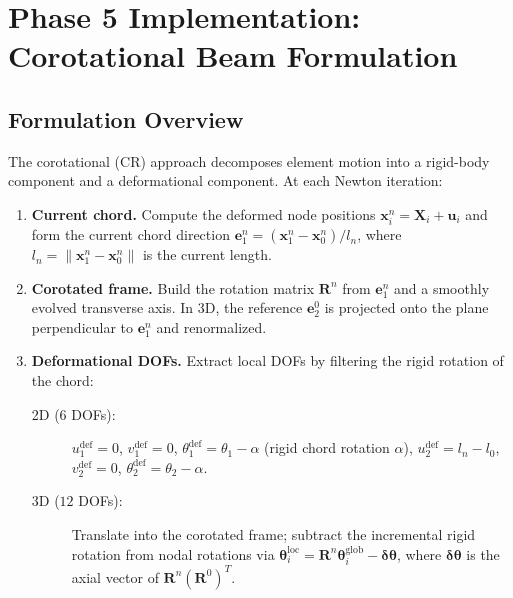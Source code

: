 \section{Phase 5 Implementation: Corotational Beam Formulation}
\label{sec:phase5-corotational}

\subsection{Formulation Overview}

The corotational (CR) approach decomposes element motion into a
rigid-body component and a deformational component.  At each Newton
iteration:

\begin{enumerate}
  \item \textbf{Current chord.}  Compute the deformed node positions
    $\mathbf{x}_i^n = \mathbf{X}_i + \mathbf{u}_i$ and form the
    current chord direction $\mathbf{e}_1^n = (\mathbf{x}_1^n -
    \mathbf{x}_0^n)/l_n$, where $l_n = \|\mathbf{x}_1^n -
    \mathbf{x}_0^n\|$ is the current length.

  \item \textbf{Corotated frame.}  Build the rotation matrix
    $\mathbf{R}^n$ from $\mathbf{e}_1^n$ and a smoothly evolved
    transverse axis.  In 3D, the reference $\mathbf{e}_2^0$ is
    projected onto the plane perpendicular to $\mathbf{e}_1^n$ and
    renormalized.

  \item \textbf{Deformational DOFs.}  Extract local DOFs by
    filtering the rigid rotation of the chord:
    \begin{description}
      \item[2D ($6$ DOFs):] $u_1^{\text{def}} = 0$,
        $v_1^{\text{def}} = 0$,
        $\theta_1^{\text{def}} = \theta_1 - \alpha$ (rigid chord
        rotation $\alpha$),
        $u_2^{\text{def}} = l_n - l_0$,
        $v_2^{\text{def}} = 0$,
        $\theta_2^{\text{def}} = \theta_2 - \alpha$.
      \item[3D ($12$ DOFs):] Translate into the corotated frame;
        subtract the incremental rigid rotation from nodal rotations
        via $\boldsymbol{\theta}_i^{\text{loc}} = \mathbf{R}^n
        \boldsymbol{\theta}_i^{\text{glob}} -
        \boldsymbol{\delta\theta}$, where $\boldsymbol{\delta\theta}$
        is the axial vector of $\mathbf{R}^n(\mathbf{R}^0)^T$.
    \end{description}


\end{enumerate}
